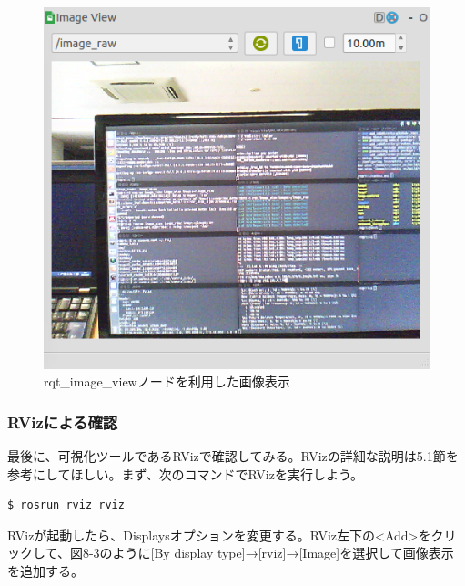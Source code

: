 \begin{figure}[ht]
  \centering
  \includegraphics[width=\columnwidth]{pictures/chapter8/pic_08_02.png}
  \caption{rqt\_image\_viewノードを利用した画像表示}
\end{figure}

\subsubsection{RVizによる確認}

最後に、可視化ツールであるRVizで確認してみる。RVizの詳細な説明は5.1節を参考にしてほしい。まず、次のコマンドでRVizを実行しよう。

\begin{lstlisting}[language=ROS]
$ rosrun rviz rviz
\end{lstlisting}

RVizが起動したら、Displaysオプションを変更する。RViz左下の<Add>をクリックして、図8-3のように[By display type]→[rviz]→[Image]を選択して画像表示を追加する。

